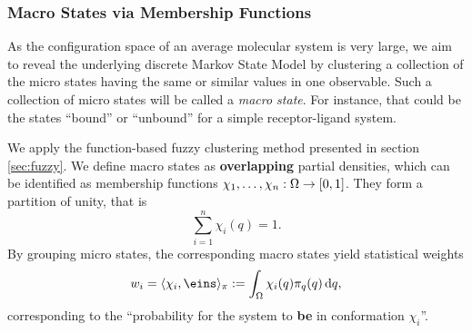 
\subsubsection*{Macro States via Membership Functions}

As the configuration space of an average molecular system is very large, we aim to reveal the underlying  discrete Markov State Model by clustering a collection of the micro states having the same or similar values in one observable. Such a collection of micro states will be called a \textit{macro state}.
For instance, that could be the states ``bound'' or ``unbound'' for a simple receptor-ligand system. %

We apply the function-based fuzzy clustering method presented in section \ref{sec:fuzzy}.
We define macro states as \textbf{overlapping} partial densities, which can be identified as membership functions $\chi_1,\dots,\chi_n : \Omega \rightarrow [0,1]$.
They form a partition of unity, that is
\begin{equation*}
\sum_{i=1}^n \chi_i(q) = 1.
\end{equation*}
By grouping micro states, the corresponding macro states yield statistical weights
\begin{equation}
\label{eq:statistical_weights}
w_i = \langle \chi_i, \eins \rangle_\pi := \int_\Omega \chi_i(q) \pi_q(q) \diff q,
\end{equation}
corresponding to the ``probability for the system to \textbf{be} in conformation $\chi_i$''. %

